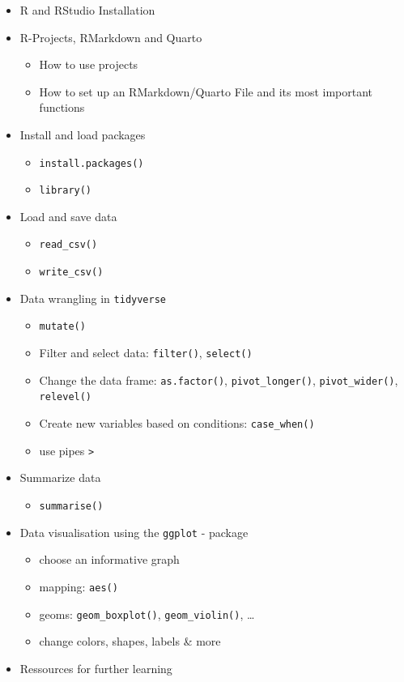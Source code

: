 \documentclass[
  letterpaper,
  DIV=11,
  numbers=noendperiod]{scrreprt}
\providecommand{\tightlist}{%
  \setlength{\itemsep}{0pt}\setlength{\parskip}{0pt}}\usepackage{longtable,booktabs,array}
\begin{document}
\begin{itemize}
\item
  R and RStudio Installation
\item
  R-Projects, RMarkdown and Quarto

  \begin{itemize}
  \item
    How to use projects
  \item
    How to set up an RMarkdown/Quarto File and its most important
    functions
  \end{itemize}
\item
  Install and load packages

  \begin{itemize}
  \item
    \texttt{install.packages()}
  \item
    \texttt{library()}
  \end{itemize}
\item
  Load and save data

  \begin{itemize}
  \item
    \texttt{read\_csv()}
  \item
    \texttt{write\_csv()}
  \end{itemize}
\item
  Data wrangling in \texttt{tidyverse}

  \begin{itemize}
  \item
    \texttt{mutate()}
  \item
    Filter and select data: \texttt{filter()}, \texttt{select()}
  \item
    Change the data frame: \texttt{as.factor()},
    \texttt{pivot\_longer()}, \texttt{pivot\_wider()},
    \texttt{relevel()}
  \item
    Create new variables based on conditions: \texttt{case\_when()}
  \item
    use pipes \texttt{\textbar{}\textgreater{}}
  \end{itemize}
\item
  Summarize data

  \begin{itemize}
  \tightlist
  \item
    \texttt{summarise()}
  \end{itemize}
\item
  Data visualisation using the \texttt{ggplot} - package

  \begin{itemize}
  \item
    choose an informative graph
  \item
    mapping: \texttt{aes()}
  \item
    geoms: \texttt{geom\_boxplot()}, \texttt{geom\_violin()}, \ldots{}
  \item
    change colors, shapes, labels \& more
  \end{itemize}
\item
  Ressources for further learning
\end{itemize}
\end{document}
